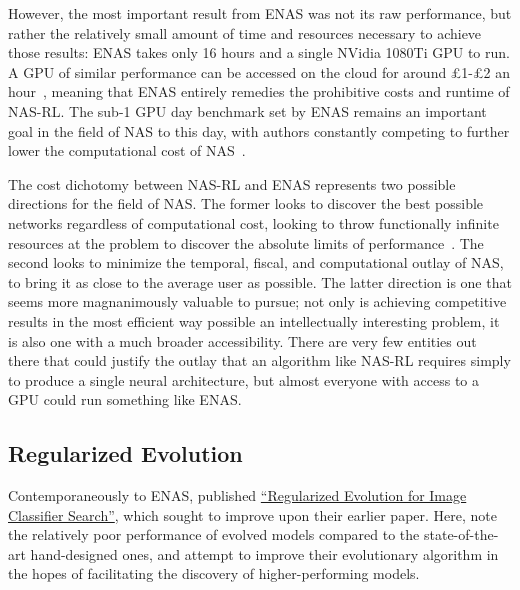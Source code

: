 However, the most important result from ENAS was not its raw performance, but rather the relatively small amount of
time and resources necessary to achieve those results: ENAS takes only 16 hours and a single NVidia 1080Ti GPU to run.
A GPU of similar performance can be accessed on the cloud for around \pounds1-\pounds2 an hour~\citep{AzurePricing}, meaning that
ENAS entirely remedies the prohibitive costs and runtime of NAS-RL. The sub-1 GPU day benchmark set by ENAS remains an
important goal in the field of NAS to this day, with authors constantly competing to further lower the
computational cost of NAS~\citep{liu2018,xu2020}.

The cost dichotomy between NAS-RL and ENAS represents two possible directions for the field of NAS. The former looks to
discover the best possible networks regardless of computational cost, looking to throw functionally infinite resources at the
problem to discover the absolute limits of performance~\citep{pham2018,huang2018}. The second looks to minimize
the temporal, fiscal, and computational outlay of NAS, to bring it as close to the average user as possible. The latter
direction is one that seems more magnanimously valuable to pursue; not only is achieving competitive results in the most
efficient way possible an intellectually interesting problem, it is also one with a much broader accessibility.
There are very few entities out there that could justify the outlay that an algorithm like NAS-RL requires simply to
produce a single neural architecture, but almost everyone with access to a GPU could run something like ENAS.

\subsection{Regularized Evolution}
Contemporaneously to ENAS, \citeauthor{real2018} published \hyperlink{cite.real2018}{``Regularized Evolution for Image Classifier Search''},
which sought to improve upon their earlier  paper. Here, \citeauthor{real2018} note the relatively poor performance
of evolved models compared to the state-of-the-art hand-designed ones, and attempt to improve their evolutionary
algorithm in the hopes of facilitating the discovery of higher-performing models.

